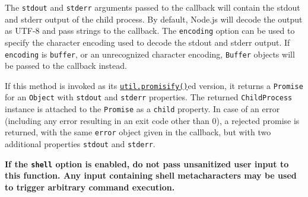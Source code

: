 The \texttt{stdout} and \texttt{stderr} arguments passed to the callback
will contain the stdout and stderr output of the child process. By
default, Node.js will decode the output as UTF-8 and pass strings to the
callback. The \texttt{encoding} option can be used to specify the
character encoding used to decode the stdout and stderr output. If
\texttt{encoding} is
\texttt{\textquotesingle{}buffer\textquotesingle{}}, or an unrecognized
character encoding, \texttt{Buffer} objects will be passed to the
callback instead.

If this method is invoked as its
\href{util.md\#utilpromisifyoriginal}{\texttt{util.promisify()}}ed
version, it returns a \texttt{Promise} for an \texttt{Object} with
\texttt{stdout} and \texttt{stderr} properties. The returned
\texttt{ChildProcess} instance is attached to the \texttt{Promise} as a
\texttt{child} property. In case of an error (including any error
resulting in an exit code other than 0), a rejected promise is returned,
with the same \texttt{error} object given in the callback, but with two
additional properties \texttt{stdout} and \texttt{stderr}.

\begin{Shaded}
\begin{Highlighting}[]
\OperatorTok{=} \NormalTok{(}\NormalTok{)}\OperatorTok{;}
\OperatorTok{=}\NormalTok{(}\NormalTok{(}\NormalTok{)}\NormalTok{)}\OperatorTok{;}
  \NormalTok{() \{}
  \OperatorTok{=}  \NormalTok{(}\OperatorTok{,}\NormalTok{ [}\NormalTok{])}\OperatorTok{;}
  \OperatorTok{;}
\NormalTok{\}}
\NormalTok{()}\OperatorTok{;}
\end{Highlighting}
\end{Shaded}

\textbf{If the \texttt{shell} option is enabled, do not pass unsanitized
user input to this function. Any input containing shell metacharacters
may be used to trigger arbitrary command execution.}


